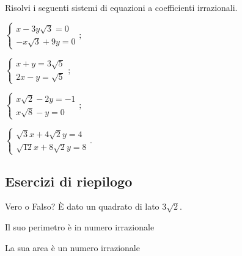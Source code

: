 \begin{esercizio}[\Ast]
 \label{ese:2.110}
Risolvi i seguenti sistemi di equazioni a coefficienti irrazionali.
 \begin{multicols}{2}
 \begin{enumeratea}
 \item $\left\{\begin{array}{l}x-3y\sqrt 3=0\\
 -x\sqrt 3+9y=0 \end{array}\right.;$
 \item $\left\{\begin{array}{l}x+y=3\sqrt 5\\
 2x-y=\sqrt 5 \end{array}\right.;$
 \item $\left\{\begin{array}{l}x\sqrt 2-2y=-1\\
 x\sqrt 8-y=0 \end{array}\right.;$
 \item $\left\{\begin{array}{l}\sqrt 3x+4\sqrt 2y=4\\
\sqrt{12}x+8\sqrt 2y=8 \end{array}\right..$
 \end{enumeratea}
 \end{multicols}
\end{esercizio}

\subsection*{Esercizi di riepilogo}

\begin{esercizio}%
Vero o Falso? È dato un quadrato di lato $3\sqrt 2$.

\TabPositions{11.5cm}
 \begin{enumeratea}
 \item Il suo perimetro è in numero irrazionale \tab\boxV\quad\boxF
 \item La sua area è un numero irrazionale\tab\boxV\quad\boxF
 \end{enumeratea}
\end{esercizio}

